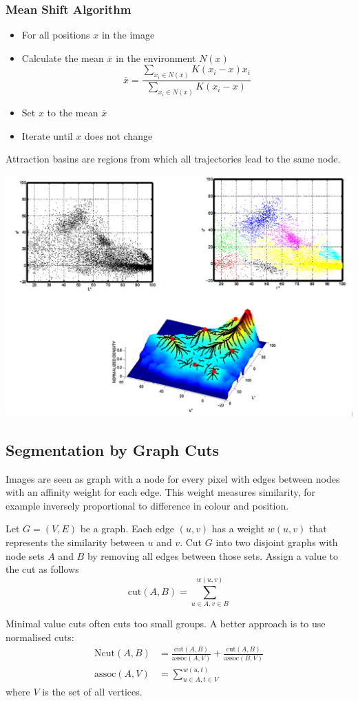 \documentclass[11pt]{article}
\theoremstyle{definition}
\newcommand*\samplemean[1]{\overline{#1}}
\begin{document}
\subsubsection{Mean Shift Algorithm}
\begin{itemize}[label=-]
	\item[] For all positions $x$ in the image
	\item Calculate the mean $\samplemean{x}$ in the environment $N(x)$
	\begin{equation*}
		\samplemean{x} = \frac{\sum_{x_i \in N(x)} K(x_i - x) x_i }{\sum_{x_i \in N(x)} K(x_i - x)}
	\end{equation*}
	\item Set $x$ to the mean $\samplemean{x}$
	\item Iterate until $x$ does not change
\end{itemize}
Attraction basins are regions from which all trajectories lead to the same node.
\begin{center}
	\includegraphics[width=0.7\linewidth]{img/attraction_basins}
\end{center}

\subsection{Segmentation by Graph Cuts}
Images are seen as graph with a node for every pixel with edges between nodes with an affinity weight for each edge. This weight  measures similarity, for example inversely proportional to difference in colour and position.
\begin{definition}
	Let $G=(V,E)$ be a graph. Each edge $(u,v)$ has a weight $w(u,v)$ that represents the similarity between $u$ and $v$. Cut $G$ into two disjoint graphs with node sets $A$ and $B$ by removing all edges between those sets. Assign a value to the cut as follows
	\begin{equation*}
		\text{cut}(A,B) = \sum_{u\in A,v\in B}^{w(u,v)}
	\end{equation*}
\end{definition}
Minimal value cuts often cuts too small groups. A better approach is to use normalised cuts:
\begin{align*}
	\text{Ncut}(A,B) &= \frac{\text{cut}(A,B)}{\text{assoc}(A,V)} + \frac{\text{cut}(A,B)}{\text{assoc}(B,V)}\\
	\text{assoc}(A,V) &= \sum_{u\in A, t\in V}^{w(u,t)}
\end{align*}
where $V$ is the set of all vertices.
\end{document}
